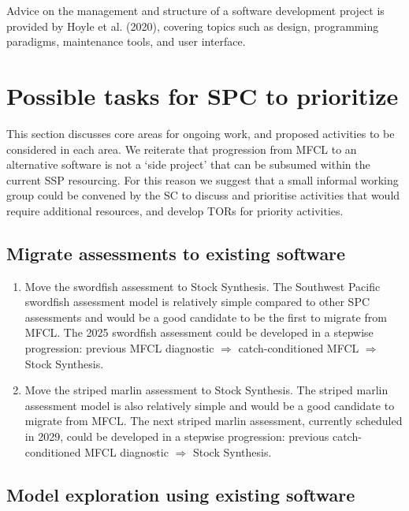 \documentclass{SCreport}
\begin{document}
Advice on the management and structure of a software development project is
provided by Hoyle et al. (2020), covering topics such as design, programming
paradigms, maintenance tools, and user interface.

\section{Possible tasks for SPC to prioritize}
\label{sec:possible-tasks}

This section discusses core areas for ongoing work, and proposed activities to
be considered in each area. We reiterate that progression from MFCL to an
alternative software is not a `side project' that can be subsumed within the
current SSP resourcing. For this reason we suggest that a small informal working
group could be convened by the SC to discuss and prioritise activities that
would require additional resources, and develop TORs for priority activities.

\subsection{Migrate assessments to existing software}

\begin{enumerate}
  \item Move the swordfish assessment to Stock Synthesis. The Southwest Pacific
  swordfish assessment model is relatively simple compared to other SPC
  assessments and would be a good candidate to be the first to migrate from
  MFCL. The 2025 swordfish assessment could be developed in a stepwise
  progression: previous MFCL diagnostic $\Rightarrow$ catch-conditioned MFCL
  $\Rightarrow$ Stock Synthesis.
  \item Move the striped marlin assessment to Stock Synthesis. The striped
  marlin assessment model is also relatively simple and would be a good
  candidate to migrate from MFCL. The next striped marlin assessment, currently
  scheduled in 2029, could be developed in a stepwise progression: previous
  catch-conditioned MFCL diagnostic $\Rightarrow$ Stock Synthesis.
\end{enumerate}

\subsection{Model exploration using existing software}
\end{document}
